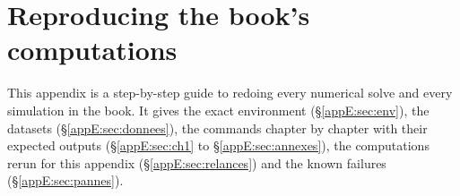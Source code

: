 \ifdefined\chemin\else
{}
\DeclareUrlCommand{}
\DeclareUrlCommand{}
\fi
\chapter{Reproducing the book's computations}\label{appE:chap}
\sloppy %

This appendix is a step-by-step guide to redoing every numerical solve and every simulation in the book. It gives the
exact environment (§\ref{appE:sec:env}), the datasets (§\ref{appE:sec:donnees}), the commands chapter by chapter with
their expected outputs (§\ref{appE:sec:ch1} to §\ref{appE:sec:annexes}), the computations rerun for this appendix
(§\ref{appE:sec:relances}) and the known failures (§\ref{appE:sec:pannes}).

